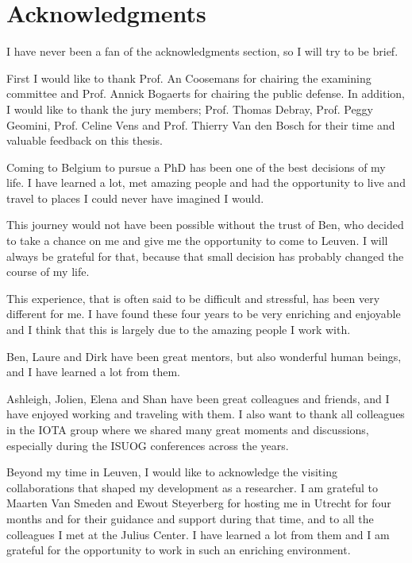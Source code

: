 \chapter*{Acknowledgments}

I have never been a fan of the acknowledgments section, so I will try to be brief.

\vspace{1em}

First I would like to thank Prof. An Coosemans for chairing the examining committee and Prof. Annick Bogaerts for chairing the public defense. In addition, I would like to thank the jury members; Prof. Thomas Debray, Prof. Peggy Geomini, Prof. Celine Vens and Prof. Thierry Van den Bosch for their time and valuable feedback on this thesis.

\vspace{1em}

Coming to Belgium to pursue a PhD has been one of the best decisions of my life. I have learned a lot, met amazing people and had the opportunity to live and travel to places I could never have imagined I would. 

This journey would not have been possible without the trust of Ben, who decided to take a chance on me and give me the opportunity to come to Leuven. I will always be grateful for that, because that small decision has probably changed the course of my life. 

This experience, that is often said to be difficult and stressful, has been very different for me. I have found these four years to be very enriching and enjoyable and I think that this is largely due to the amazing people I work with. 

\vspace{1em}

Ben, Laure and Dirk have been great mentors, but also wonderful human beings, and I have learned a lot from them. 

Ashleigh, Jolien, Elena and Shan have been great colleagues and friends, and I have enjoyed working and traveling with them. I also want to thank all colleagues in the IOTA group where we shared many great moments and discussions, especially during the ISUOG conferences across the years. 

\vspace{1em}

Beyond my time in Leuven, I would like to acknowledge the visiting collaborations that shaped my development as a researcher. I am grateful to Maarten Van Smeden and Ewout Steyerberg for hosting me in Utrecht for four months and for their guidance and support during that time, and to all the colleagues I met at the Julius Center. I have learned a lot from them and I am grateful for the opportunity to work in such an enriching environment.

